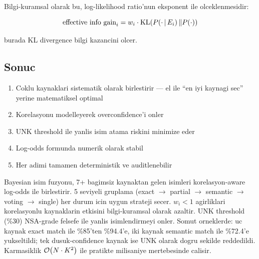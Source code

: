 Bilgi-kuramsal olarak bu, log-likelihood ratio'nun eksponent ile olceklenmesidir:

\begin{equation}
\text{effective info gain}_i = w_i \cdot \text{KL}(P\!\left(\cdot \,|\, E_i\right) \| P\!\left(\cdot\right))
\end{equation}

burada KL divergence bilgi kazancini olcer.

\subsection{Sonuc}

\begin{basari}
\begin{enumerate}
\item Coklu kaynaklari sistematik olarak birlestirir --- el ile ``en iyi kaynagi sec'' yerine matematiksel optimal
\item Korelasyonu modelleyerek overconfidence'i onler
\item UNK threshold ile yanlis isim atama riskini minimize eder
\item Log-odds formunda numerik olarak stabil
\item Her adimi tamamen deterministik ve auditlenebilir
\end{enumerate}
\end{basari}


\begin{ozet}
Bayesian isim fuzyonu, 7+ bagimsiz kaynaktan gelen isimleri korelasyon-aware log-odds ile birlestirir. 5 seviyeli gruplama (exact $\to$ partial $\to$ semantic $\to$ voting $\to$ single) her durum icin uygun strateji secer. $w_i < 1$ agirliklari korelasyonlu kaynaklarin etkisini bilgi-kuramsal olarak azaltir. UNK threshold (\%30) NSA-grade felsefe ile yanlis isimlendirmeyi onler. Somut orneklerde: uc kaynak exact match ile \%85'ten \%94.4'e, iki kaynak semantic match ile \%72.4'e yukseltildi; tek dusuk-confidence kaynak ise UNK olarak dogru sekilde reddedildi. Karmasiklik $\mathcal{O}\!\left(N \cdot K^2\right)$ ile pratikte milisaniye mertebesinde calisir.
\end{ozet}
